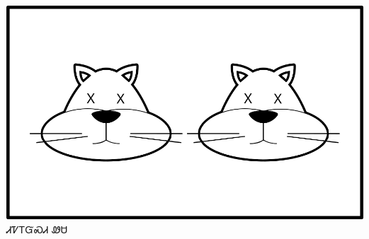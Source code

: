 \documentclass[avery5371]{flashcards}%
\begin{document}
\begin{flashcard}{
\includegraphics[width=0.95\columnwidth,height=.51\columnwidth,keepaspectratio]{../artwork/for-colors/wesa-tali-dead}
}
\Huge ᏗᏤᎢᏳᏍᏗ ᏪᏌ
\end{flashcard}
\end{document}
